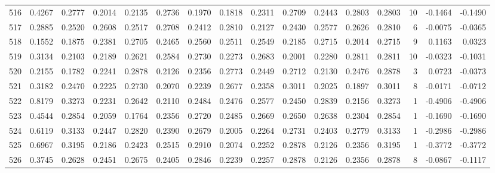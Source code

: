 \begin{tabular}{lrrrrrrrrrrrrrrr}
516 &      0.4267 &  0.2777 &  0.2014 &  0.2135 &  0.2736 &  0.1970 &  0.1818 &  0.2311 &  0.2709 &  0.2443 &   0.2803 &     0.2803 &     10 &                   -0.1464 &                    -0.1490 \\
517 &      0.2885 &  0.2520 &  0.2608 &  0.2517 &  0.2708 &  0.2412 &  0.2810 &  0.2127 &  0.2430 &  0.2577 &   0.2626 &     0.2810 &      6 &                   -0.0075 &                    -0.0365 \\
518 &      0.1552 &  0.1875 &  0.2381 &  0.2705 &  0.2465 &  0.2560 &  0.2511 &  0.2549 &  0.2185 &  0.2715 &   0.2014 &     0.2715 &      9 &                    0.1163 &                     0.0323 \\
519 &      0.3134 &  0.2103 &  0.2189 &  0.2621 &  0.2584 &  0.2730 &  0.2273 &  0.2683 &  0.2001 &  0.2280 &   0.2811 &     0.2811 &     10 &                   -0.0323 &                    -0.1031 \\
520 &      0.2155 &  0.1782 &  0.2241 &  0.2878 &  0.2126 &  0.2356 &  0.2773 &  0.2449 &  0.2712 &  0.2130 &   0.2476 &     0.2878 &      3 &                    0.0723 &                    -0.0373 \\
521 &      0.3182 &  0.2470 &  0.2225 &  0.2730 &  0.2070 &  0.2239 &  0.2677 &  0.2358 &  0.3011 &  0.2025 &   0.1897 &     0.3011 &      8 &                   -0.0171 &                    -0.0712 \\
522 &      0.8179 &  0.3273 &  0.2231 &  0.2642 &  0.2110 &  0.2484 &  0.2476 &  0.2577 &  0.2450 &  0.2839 &   0.2156 &     0.3273 &      1 &                   -0.4906 &                    -0.4906 \\
523 &      0.4544 &  0.2854 &  0.2059 &  0.1764 &  0.2356 &  0.2720 &  0.2485 &  0.2669 &  0.2650 &  0.2638 &   0.2304 &     0.2854 &      1 &                   -0.1690 &                    -0.1690 \\
524 &      0.6119 &  0.3133 &  0.2447 &  0.2820 &  0.2390 &  0.2679 &  0.2005 &  0.2264 &  0.2731 &  0.2403 &   0.2779 &     0.3133 &      1 &                   -0.2986 &                    -0.2986 \\
525 &      0.6967 &  0.3195 &  0.2186 &  0.2423 &  0.2515 &  0.2910 &  0.2074 &  0.2252 &  0.2878 &  0.2126 &   0.2356 &     0.3195 &      1 &                   -0.3772 &                    -0.3772 \\
526 &      0.3745 &  0.2628 &  0.2451 &  0.2675 &  0.2405 &  0.2846 &  0.2239 &  0.2257 &  0.2878 &  0.2126 &   0.2356 &     0.2878 &      8 &                   -0.0867 &                    -0.1117 \\

\end{tabular}
